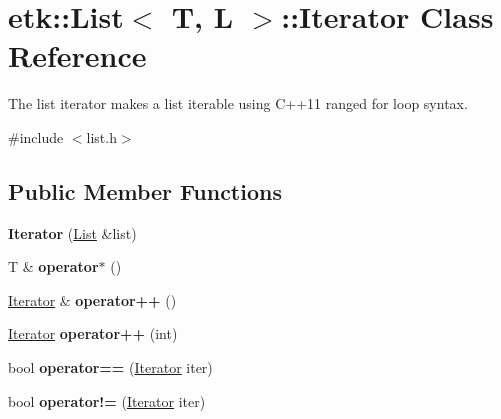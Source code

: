 \hypertarget{classetk_1_1_list_1_1_iterator}{\section{etk\-:\-:List$<$ T, L $>$\-:\-:Iterator Class Reference}
\label{classetk_1_1_list_1_1_iterator}
}


The list iterator makes a list iterable using C++11 ranged for loop syntax.  




{\ttfamily \#include $<$list.\-h$>$}

\subsection*{Public Member Functions}
\begin{DoxyCompactItemize}
\item 
\hypertarget{classetk_1_1_list_1_1_iterator_a6a299eafca46db90564fdbffca60c7fa}{{\bfseries Iterator} (\hyperlink{classetk_1_1_list}{List} \&list)}\label{classetk_1_1_list_1_1_iterator_a6a299eafca46db90564fdbffca60c7fa}

\item 
\hypertarget{classetk_1_1_list_1_1_iterator_a368d2b78fd175b0dac43aee52dc54f8f}{T \& {\bfseries operator$\ast$} ()}\label{classetk_1_1_list_1_1_iterator_a368d2b78fd175b0dac43aee52dc54f8f}

\item 
\hypertarget{classetk_1_1_list_1_1_iterator_aa7b714a588a29db93f9e406223b8783c}{\hyperlink{classetk_1_1_list_1_1_iterator}{Iterator} \& {\bfseries operator++} ()}\label{classetk_1_1_list_1_1_iterator_aa7b714a588a29db93f9e406223b8783c}

\item 
\hypertarget{classetk_1_1_list_1_1_iterator_ae1f9efc5598a14487881bd7281fd27dd}{\hyperlink{classetk_1_1_list_1_1_iterator}{Iterator} {\bfseries operator++} (int)}\label{classetk_1_1_list_1_1_iterator_ae1f9efc5598a14487881bd7281fd27dd}

\item 
\hypertarget{classetk_1_1_list_1_1_iterator_a971c5acbef70bdd9a9513a87ad40fd4e}{bool {\bfseries operator==} (\hyperlink{classetk_1_1_list_1_1_iterator}{Iterator} iter)}\label{classetk_1_1_list_1_1_iterator_a971c5acbef70bdd9a9513a87ad40fd4e}

\item 
\hypertarget{classetk_1_1_list_1_1_iterator_a7c9b29d64794609438e68b928125f14b}{bool {\bfseries operator!=} (\hyperlink{classetk_1_1_list_1_1_iterator}{Iterator} iter)}\label{classetk_1_1_list_1_1_iterator_a7c9b29d64794609438e68b928125f14b}

\end{DoxyCompactItemize}
